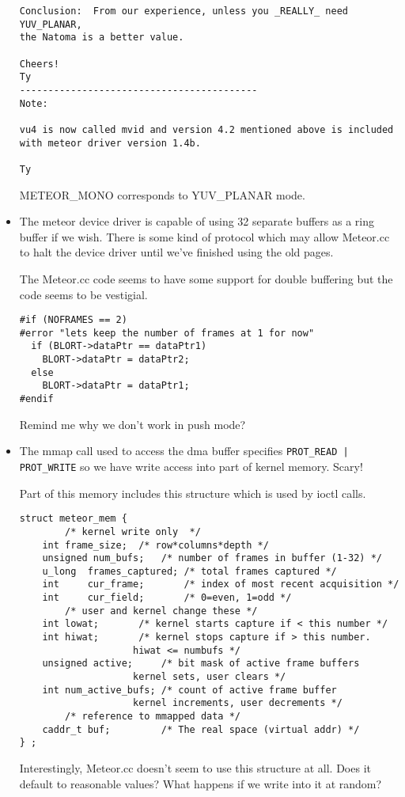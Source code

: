 \begin{itemize}
\begin{verbatim}
Conclusion:  From our experience, unless you _REALLY_ need YUV_PLANAR,
the Natoma is a better value.

Cheers!
Ty
------------------------------------------
Note:

vu4 is now called mvid and version 4.2 mentioned above is included
with meteor driver version 1.4b.

Ty
\end{verbatim}

METEOR\_MONO corresponds to YUV\_PLANAR mode.

\item
The meteor device driver is capable of using 32 separate buffers
as a ring buffer if we wish.  There is some kind of protocol
which may allow Meteor.cc to halt the device driver until
we've finished using the old pages.

The Meteor.cc code seems to have some support for double buffering
but the code seems to be vestigial.

\begin{verbatim}
#if (NOFRAMES == 2)
#error "lets keep the number of frames at 1 for now"
  if (BLORT->dataPtr == dataPtr1)
    BLORT->dataPtr = dataPtr2;
  else
    BLORT->dataPtr = dataPtr1;       
#endif
\end{verbatim}

Remind me why we don't work in push mode?

\item
The mmap call used to access the dma buffer specifies {\tt PROT\_READ | PROT\_WRITE}
so we have write access into part of kernel memory.  Scary!

Part of this memory includes this structure which is used by ioctl calls.

\begin{verbatim}
struct meteor_mem {
		/* kernel write only  */
	int	frame_size;	 /* row*columns*depth */
	unsigned num_bufs;	 /* number of frames in buffer (1-32) */
	u_long  frames_captured; /* total frames captured */
	int     cur_frame;       /* index of most recent acquisition */
	int     cur_field;       /* 0=even, 1=odd */
		/* user and kernel change these */
	int	lowat;		 /* kernel starts capture if < this number */
	int	hiwat;		 /* kernel stops capture if > this number.
				    hiwat <= numbufs */
	unsigned active;	 /* bit mask of active frame buffers
				    kernel sets, user clears */
	int	num_active_bufs; /* count of active frame buffer
				    kernel increments, user decrements */
		/* reference to mmapped data */
	caddr_t	buf;		 /* The real space (virtual addr) */
} ;
\end{verbatim}

Interestingly, Meteor.cc doesn't seem to use this structure at all.
Does it default to reasonable values?
What happens if we write into it at random?

\end{itemize}

